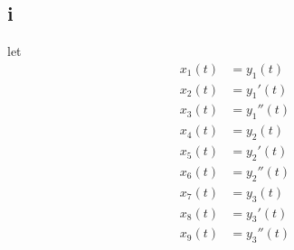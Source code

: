 \documentclass[12pt,a4paper]{article}
\begin{document}
\subsection*{i}
let
\[
    \begin{aligned}
        x_1(t) &= y_1(t) \\
        x_2(t) &= y_1'(t) \\
        x_3(t) &= y_1''(t) \\
        x_4(t) &= y_2(t) \\
        x_5(t) &= y_2'(t) \\
        x_6(t) &= y_2''(t) \\
        x_7(t) &= y_3(t) \\
        x_8(t) &= y_3'(t) \\
        x_9(t) &= y_3''(t) \\
    \end{aligned}
\]
\end{document}
